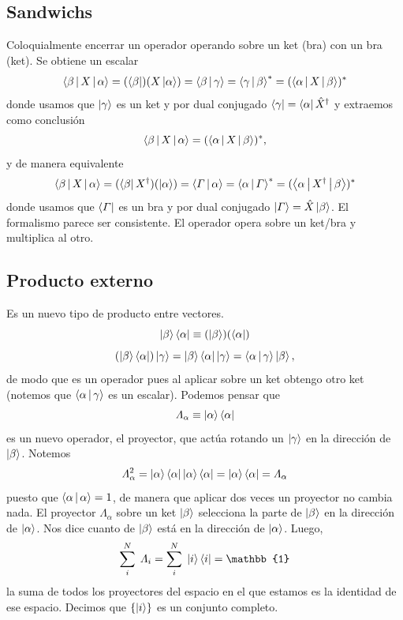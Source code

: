 \documentclass[10pt,oneside]{CBFT_book}
\begin{document}
\subsection{Sandwichs}

Coloquialmente encerrar un operador operando sobre un ket (bra) con un bra (ket).
Se obtiene un escalar
\[
	\Braket{\beta|X|\alpha} = (\Bra{\beta})(X\Ket{\alpha}) = \Braket{\beta|\gamma} =
	\Braket{\gamma|\beta}^* = (\Braket{\alpha|X|\beta})^*
\]
donde usamos que $\Ket{\gamma}$ es un ket y por dual conjugado $\Bra{\gamma} = \Bra{\alpha}\hat{X}^\dagger$ y
extraemos como conclusión 
\[
	\Braket{\beta|X|\alpha} = (\Braket{\alpha|X|\beta})^*,
\]
y de manera equivalente
\[
	\Braket{\beta|X|\alpha} = (\Bra{\beta}X^\dagger)(\Ket{\alpha}) = \Braket{\Gamma|\alpha} =
	\Braket{\alpha|\Gamma}^* = (\Braket{\alpha|X^\dagger|\beta})^*
\]
donde usamos que $\Bra{\Gamma}$ es un bra y por dual conjugado $\Ket{\Gamma} = \hat{X}\Ket{\beta}$.
El formalismo parece ser consistente. El operador opera sobre un ket/bra y multiplica al otro.


\subsection{Producto externo}

Es un nuevo tipo de producto entre vectores.
\[
	\Ket{\beta} \Bra{\alpha} \equiv (\Ket{\beta} )( \Bra{\alpha} )
\]
\[
	( \Ket{\beta} \Bra{\alpha} )\Ket{\gamma} = 
	\Ket{\beta} \Bra{\alpha} \Ket{\gamma} =
	\Braket{\alpha|\gamma} \Ket{\beta} , 
\]
de modo que es un operador pues al aplicar sobre un ket obtengo otro ket 
(notemos que $\Braket{\alpha|\gamma}$ es un escalar). Podemos pensar que 
\[
	\Lambda_\alpha \equiv \Ket{\alpha}\Bra{\alpha}
\]
es un nuevo operador, el proyector, que actúa rotando un $\Ket{\gamma}$ en 
la dirección de $\Ket{\beta}$. 
Notemos 
\[
	\Lambda_\alpha^2 = \Ket{\alpha}\Bra{\alpha}\Ket{\alpha}\Bra{\alpha} = 
	\Ket{\alpha}\Bra{\alpha} = \Lambda_\alpha
\]
puesto que $\Braket{\alpha|\alpha}=1$, de manera que aplicar dos veces un 
proyector no cambia nada.
El proyector $\Lambda_\alpha$ sobre un ket $\Ket{\beta}$ selecciona la parte de
$\Ket{\beta}$ en la dirección de $\Ket{\alpha}$. Nos dice cuanto de $\Ket{\beta}$ 
está en la dirección de $\Ket{\alpha}$.
Luego,
\[
	\sum_i^N \; \Lambda_i = \sum_i^N \; \Ket{i}\Bra{i} = \mathbb{1}
\]
la suma de todos los proyectores del espacio en el que estamos es la identidad de
ese espacio.
Decimos que $\{ \Ket{i} \}$ es un conjunto completo. 
\end{document}
